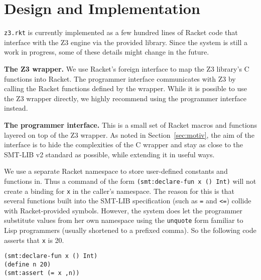 \section{Design and Implementation}

\texttt{z3.rkt} is currently implemented as a few hundred lines of Racket code
that interface with the Z3 engine via the provided library. Since the system is
still a work in progress, some of these details might change in the future.

\textbf{The Z3 wrapper.} We use Racket's foreign interface \cite{racket/foreign}
to map the Z3 library's C functions into Racket. The programmer interface
communicates with Z3 by calling the Racket functions defined by the
wrapper. While it is possible to use the Z3 wrapper directly, we highly
recommend using the programmer interface instead.

\textbf{The programmer interface.} This is a small set of Racket macros and
functions layered on top of the Z3 wrapper. As noted in Section~\ref{sec:motiv},
the aim of the interface is to hide the complexities of the C wrapper and stay
as close to the SMT-LIB v2 standard \cite{smtlib2:10} as possible, while
extending it in useful ways.

We use a separate Racket namespace to store user-defined constants and functions
in. Thus a command of the form \texttt{(smt:declare-fun x () Int)} will not
create a binding for \texttt{x} in the caller's namespace. The reason for this
is that several functions built into the SMT-LIB specification (such as
\texttt{=} and \texttt{<=}) collide with Racket-provided symbols. However, the
system does let the programmer substitute values from her own namespace using
the \texttt{unquote} form familiar to Lisp programmers (usually shortened to a
prefixed comma). So the following code asserts that \texttt{x} is 20.

\begin{verbatim}
(smt:declare-fun x () Int)
(define n 20)
(smt:assert (= x ,n))
\end{verbatim} 
